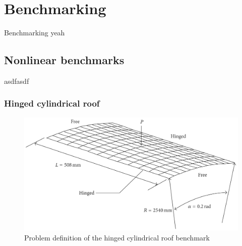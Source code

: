 


\renewcommand{\Thema}{Benchmarking}



\chapter{Benchmarking}

Benchmarking yeah

\section{Nonlinear benchmarks}

asdfasdf

\subsection{Hinged cylindrical roof}

\begin{figure}[H]
	\centering
	\def\svgwidth{\columnwidth}
	\includegraphics[width=12cm]{images/hinged_cylindrical_roof.png}
	\caption{Problem definition of the hinged cylindrical roof benchmark \cite{Jung13}}
	\label{benchmark_hinged_cylindrical_roof}
\end{figure}

